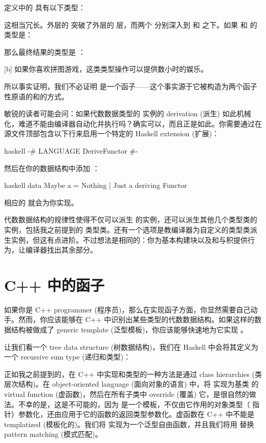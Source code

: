  定义中的  具有以下类型：

这相当冗长。外层的  突破了外层的  层，而两个  分别深入到  和  之下。如果  和  的类型是：

那么最终结果的类型是 ：

[b]
如果你喜欢拼图游戏，这类类型操作可以提供数小时的娱乐。

所以事实证明，我们不必证明  是一个函子——这个事实源于它被构造为两个函子性原语的和的方式。

敏锐的读者可能会问：如果代数数据类型的  实例的 derivation (派生) 如此机械化，难道不能由编译器自动化并执行吗？确实可以，而且正是如此。你需要通过在源文件顶部包含以下行来启用一个特定的 Haskell extension (扩展)：

\begin{snip}{haskell}
{-# LANGUAGE DeriveFunctor #-}
\end{snip}
然后在你的数据结构中添加 ：

\begin{snip}{haskell}
data Maybe a = Nothing | Just a deriving Functor
\end{snip}
相应的  就会为你实现。

代数数据结构的规律性使得不仅可以派生  的实例，还可以派生其他几个类型类的实例，包括我之前提到的  类型类。还有一个选项是教编译器为自定义的类型类派生实例，但这有点进阶。不过想法是相同的：你为基本构建块以及和与积提供行为，让编译器找出其余部分。

\section{C++ 中的函子}

如果你是 C++ programmer (程序员)，那么在实现函子方面，你显然需要自己动手。然而，你应该能够在 C++ 中识别出某些类型的代数数据结构。如果这样的数据结构被做成了 generic template (泛型模板)，你应该能够快速地为它实现 。

让我们看一个 tree data structure (树数据结构)，我们在 Haskell 中会将其定义为一个 recursive sum type (递归和类型)：

正如我之前提到的，在 C++ 中实现和类型的一种方法是通过 class hierarchies (类层次结构)。在 object-oriented language (面向对象的语言) 中，将  实现为基类  的 virtual function (虚函数)，然后在所有子类中 override (覆盖) 它，是很自然的做法。不幸的是，这是不可能的，因为  是一个模板，不仅由它作用的对象类型（ 指针）参数化，还由应用于它的函数的返回类型参数化。虚函数在 C++ 中不能是 templatized (模板化的)。我们将  实现为一个泛型自由函数，并且我们将用  替换 pattern matching (模式匹配)。

